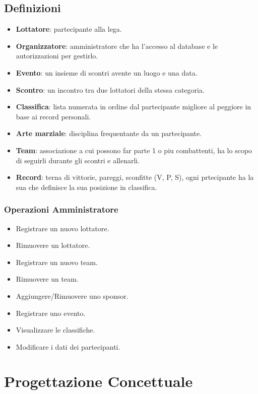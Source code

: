 \documentclass[a4paper,12pt]{report}
\begin{document}
\section{Definizioni}
\begin{itemize}
    \item \textbf{Lottatore}: partecipante alla lega.
    \item \textbf{Organizzatore}: amministratore che ha l'accesso al database e le autorizzazioni per gestirlo. 
    \item \textbf{Evento}: un insieme di scontri avente un luogo e una data.
    \item \textbf{Scontro}: un incontro tra due lottatori della stessa categoria.
    \item \textbf{Classifica}: lista numerata in ordine dal partecipante migliore al peggiore in base ai record personali.
    \item \textbf{Arte marziale}: disciplina frequentante da un partecipante.
    \item \textbf{Team}: associazione a cui possono far parte 1 o piu combattenti, ha lo scopo di seguirli durante gli scontri e allenarli.
    \item \textbf{Record}: terna di vittorie, pareggi, sconfitte (V, P, S), ogni prtecipante ha la sua che definisce la sua posizione in 
        classifica.
\end{itemize}

\subsection{Operazioni Amministratore}
\begin{itemize}
    \item Registrare un nuovo lottatore.
    \item Rimuovere un lottatore.
    \item Registrare un nuovo team.
    \item Rimuovere un team.
    \item Aggiungere/Rimuovere uno sponsor.
    \item Registrare uno evento.
    \item Visualizzare le classifiche.
    \item Modificare i dati dei partecipanti.
\end{itemize}

\chapter{Progettazione Concettuale}
\end{document}
